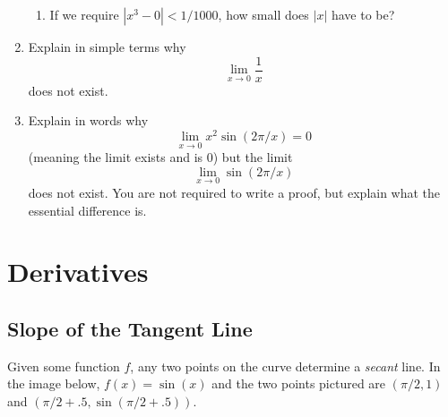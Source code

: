 \documentclass[11pt]{book}
\numberwithin{example}{chapter}
\begin{document}
\begin{enumerate}
\begin{enumerate}
\item
If we require $|x^3-0|<1/1000$, how small does $|x|$ have to be?  



\end{enumerate}

\item

Explain in simple terms why $$\lim_{x\to 0} \frac{1}{x}$$ does not exist.  



\item
Explain in words why $$\lim_{x\to 0} x^2 \sin(2\pi/x)=0$$ (meaning the limit exists and is 0) but the limit $$\lim_{x\to 0} \sin(2\pi/x)$$ does not exist.  You are not required to write a proof, but explain what the essential difference is.









\end{enumerate}




\chapter{Derivatives}  

\section{Slope of the Tangent Line}

Given some function $f$, any two points on the curve determine a \emph{secant} line.  In the image below, $f(x)=\sin(x)$ and the two points pictured are $(\pi/2,1)$ and $(\pi/2+.5,\sin(\pi/2+.5))$.  


\begin{center}
\end{center}
\end{document}
